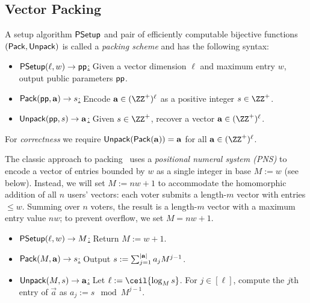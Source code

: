 \subsection{Vector Packing}\label{sec:packing}

\begin{definition}\label{def:packing}
A setup algorithm $\mathsf{PSetup}$ and pair of efficiently computable bijective functions $(\mathsf{Pack},\mathsf{Unpack})$ is called a \emph{packing scheme} and has the following syntax:
    \begin{itemize}
        \item \underline{$\mathsf{PSetup}(\ell, w) \to \mathsf{pp}$:} Given a vector dimension $\ell$ and maximum entry $w$, output public parameters $\mathsf{pp}$.
        \item \underline{$\pack(\pparam, \Vec{a}) \to s$:} Encode $\Vec{a} \in (\ZZ^+)^\ell$ as a positive integer $s \in \ZZ^+$. 
        \item \underline{$\unpack(\pparam, s) \to \Vec{a}$:} Given $s \in \ZZ^+$, recover a vector $\Vec{a} \in (\ZZ^+)^\ell$. 
    \end{itemize}
For \emph{correctness} we require $\unpack(\pack(\Vec{a}))=\Vec{a}$ for all $\Vec{a}\in (\ZZ^+)^\ell$.
\end{definition}

The classic approach to packing~\cite{ACNS:Groth05,EC:HirSak00} uses a \emph{positional numeral system (PNS)} to encode a vector of entries bounded by $w$ as a single integer in base $M := w$ (see  below).
Instead, we will set $M:= nw+1$ to accommodate the homomorphic addition of all $n$ users' vectors: each voter submits a length-$m$ vector with entries $\leq w$. Summing over $n$ voters, the result is a length-$m$ vector with a maximum entry value $nw$; to prevent overflow, we set $M = nw+1$.

\begin{construction}\label{con:packingPNS}
\hfill
\begin{itemize}%
    \item \underline{$\mathsf{PSetup}(\ell, w) \to M$:} Return $M := w + 1$.
    \item \underline{$\pack(M, \Vec{a}) \to s$:} Output $s := \sum_{j=1}^{\lvert \mathbf{a} \rvert} a_j M^{j-1}$.
    \item \underline{$\unpack(M, s) \to \Vec{a}$:} Let $\ell := \ceil{\log_M{s}}$. For $j \in [\ell]$, compute the $j$th entry of $\Vec{a}$ as $a_j := s \mod{M^{j-1}}$.
\end{itemize}
\end{construction}

